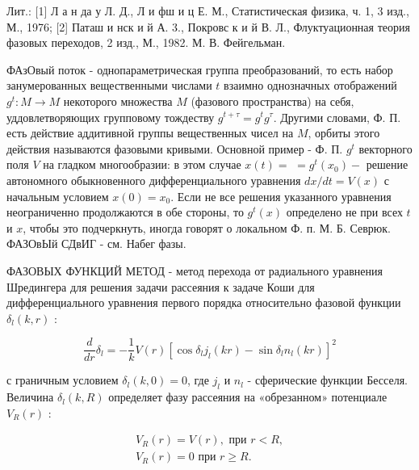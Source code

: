\documentclass[10pt]{article}
\begin{document}
Лит.: [1] Л а н да у Л. Д., Л и фш и ц Е. М., Статистическая физика, ч. 1, 3 изд., М., 1976; [2] Паташ и нск и й А. 3., Покровс к и й В. Л., Флуктуационная теория фазовых переходов, 2 изд., М., 1982. М. В. Фейгельман.



ФАзОвый поток - однопараметрическая группа преобразований, то есть набор занумерованных вещественными числами $t$ взаимно однозначных отображений $g^{t}: M \rightarrow M$ некоторого множества $M$ (фазового пространства) на себя, уддовлетворяющих групповому тождеству $g^{t+\tau}=g^{t} g^{\tau}$. Другими словами, Ф. П. есть действие аддитивной группы вещественных чисел на $M$, орбиты этого действия называются фазовыми кривыми. Основной пример - Ф. П. $g^{t}$ векторного поля $V$ на гладком многообразии: в этом случае $x(t)=$ $=g^{t}\left(x_{0}\right)-$ решение автономного обыкновенного дифференциального уравнения $d x / d t=V(x)$ с начальным условием $x(0)=x_{0}$. Если не все решения указанного уравнения неограниченно продолжаются в обе стороны, то $g^{t}(x)$ определено не при всех $t$ и $x$, чтобы это подчеркнуть, иногда говорят о локальном Ф. п. М. Б. Севрюк. ФАЗОвЫй СДвИГ - см. Набег фазы.



ФАЗОВЫХ ФУНКЦИЙ МЕТОД - метод перехода от радиального уравнения Шредингера для решения задачи рассеяния к задаче Коши для дифференциального уравнения первого порядка относительно фазовой функции $\delta_{l}(k, r)$ :



\[

\frac{d}{d r} \delta_{l}=-\frac{1}{k} V(r)\left[\cos \delta_{l} j_{l}(k r)-\sin \delta_{l} n_{l}(k r)\right]^{2}

\]



с граничным условием $\delta_{l}(k, 0)=0$, где $j_{l}$ и $n_{l}$ - сферические функции Бесселя. Величина $\delta_{l}(k, R)$ определяет фазу рассеяния на «обрезанном» потенциале $V_{R}(r)$ :



\[

\begin{gathered}

V_{R}(r)=V(r), \text { при } r<R, \\

V_{R}(r)=0 \text { при } r \geqslant R .

\end{gathered}

\]
\end{document}
